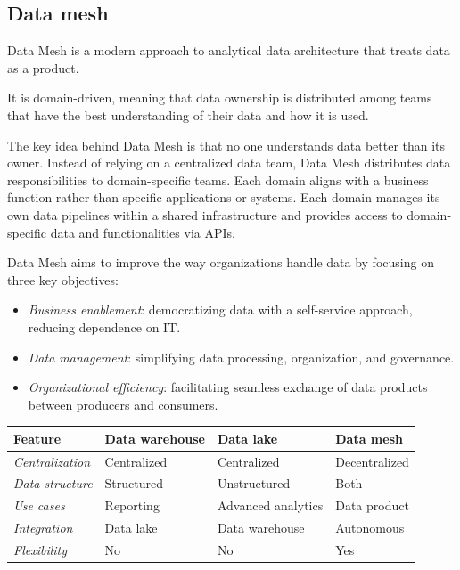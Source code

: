 \subsection{Data mesh}
\begin{definition}
    Data Mesh is a modern approach to analytical data architecture that treats data as a product.
\end{definition}
\noindent It is domain-driven, meaning that data ownership is distributed among teams that have the best understanding of their data and how it is used.

The key idea behind Data Mesh is that no one understands data better than its owner. 
Instead of relying on a centralized data team, Data Mesh distributes data responsibilities to domain-specific teams. 
Each domain aligns with a business function rather than specific applications or systems.
Each domain manages its own data pipelines within a shared infrastructure and provides access to domain-specific data and functionalities via APIs.

Data Mesh aims to improve the way organizations handle data by focusing on three key objectives:
\begin{itemize}
    \item \textit{Business enablement}: democratizing data with a self-service approach, reducing dependence on IT.
    \item \textit{Data management}: simplifying data processing, organization, and governance.
    \item \textit{Organizational efficiency}: facilitating seamless exchange of data products between producers and consumers.
\end{itemize}

\renewcommand{\arraystretch}{1.5}
\begin{table}[!ht]
    \centering

    \begin{tabular}{|l|p{4cm}|p{4cm}|p{4cm}|}
        \hline
        \textbf{Feature} & \textbf{Data warehouse} & \textbf{Data lake} & \textbf{Data mesh} \\ \hline
        \textit{Centralization} & Centralized & Centralized & Decentralized \\ \hline
        \textit{Data structure} & Structured & Unstructured & Both \\ \hline
        \textit{Use cases} & Reporting & Advanced analytics & Data product \\ \hline
        \textit{Integration} & Data lake & Data warehouse & Autonomous \\ \hline
        \textit{Flexibility} & No & No & Yes \\ \hline
    \end{tabular}
\end{table}
\renewcommand{\arraystretch}{1}

